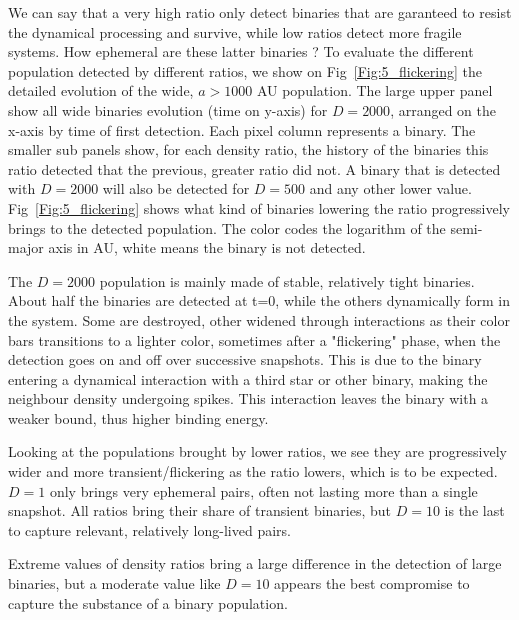  We can say that a very high ratio only detect binaries that are garanteed to resist the dynamical processing and survive, while low ratios detect more fragile systems. How ephemeral are these latter binaries ? To evaluate the different population detected by different ratios, we show on Fig~\ref{Fig:5_flickering} the detailed evolution of the wide, $a>1000$ AU population. The large upper panel show all wide binaries evolution (time on y-axis) for $D=2000$, arranged on the x-axis by time of first detection. Each pixel column represents a binary. The smaller sub panels show, for each density ratio, the history of the binaries this ratio detected that the previous, greater ratio did not. A binary that is detected with $D=2000$ will also be detected for $D=500$ and any other lower value. Fig~\ref{Fig:5_flickering} shows what kind of binaries lowering the ratio progressively brings to the detected population. The color codes the logarithm of the semi-major axis in AU, white means the binary is not detected.

The $D=2000$ population is mainly made of stable, relatively tight binaries. About half the binaries are detected at t=0, while the others dynamically form in the system. Some are destroyed, other widened through interactions as their color bars transitions to a lighter color, sometimes after a "flickering" phase, when the detection goes on and off over successive snapshots. This is due to the binary entering a dynamical interaction with a third star or other binary, making the neighbour density undergoing spikes. This interaction leaves the binary with a weaker bound, thus higher binding energy. 

Looking at the populations brought by lower ratios, we see they are progressively wider and more transient/flickering as the ratio lowers, which is to be expected. $D=1$ only brings very ephemeral pairs, often not lasting more than a single snapshot. All ratios bring their share of transient binaries, but $D=10$ is the last to capture relevant, relatively long-lived pairs.

Extreme values of density ratios bring a large difference in the detection of large binaries, but a moderate value like $D=10$ appears the best compromise to capture the substance of a binary population.




